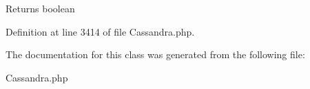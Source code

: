 \begin{DoxyReturn}{Returns}
boolean 
\end{DoxyReturn}


Definition at line 3414 of file Cassandra.php.




The documentation for this class was generated from the following file:\begin{DoxyCompactItemize}
\item 
Cassandra.php\end{DoxyCompactItemize}
